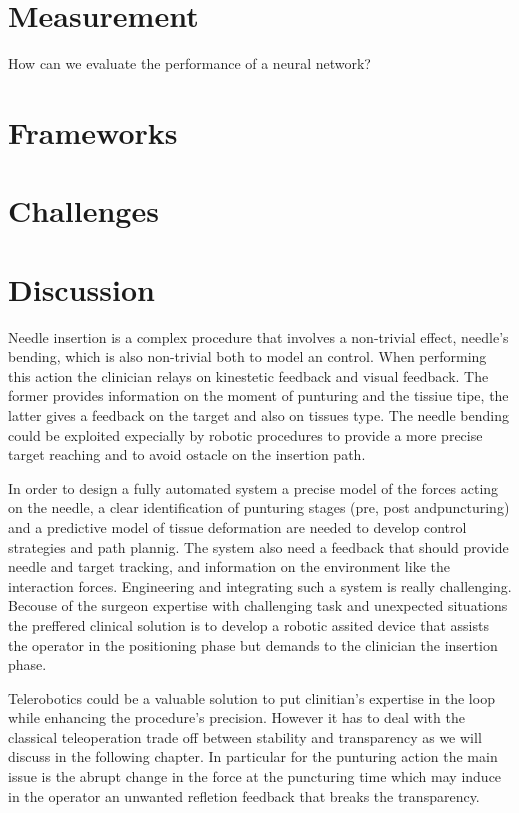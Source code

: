 \section{Measurement}
How can we evaluate the performance of a neural network?



\section{Frameworks}


\section{Challenges}

\section{Discussion}
Needle insertion is a complex procedure that involves a non-trivial effect, needle's bending, which is also non-trivial both to model an control.
When performing this action the clinician relays on kinestetic feedback and visual feedback. The former provides information on the moment of punturing and the tissiue tipe, the latter gives a feedback on the target and also on tissues type.
The needle bending could be exploited expecially by robotic procedures to provide a more precise target reaching and to avoid ostacle on the insertion path.

In order to design a fully automated system a precise model of the forces acting on the needle, a clear identification of punturing stages (pre, post andpuncturing) and a predictive model of tissue deformation are needed to develop control strategies and path plannig. The system also need a feedback that should provide needle and target tracking, and information on the environment like the interaction forces.
Engineering and integrating such a system is really challenging.
Becouse of the surgeon expertise with challenging task and unexpected situations the preffered clinical solution is to develop a robotic assited device that assists the operator in the positioning phase but demands to the clinician the insertion phase.

Telerobotics could be a valuable solution to put clinitian's expertise in the loop while enhancing the procedure's precision. However it has to deal with the classical teleoperation trade off between stability and transparency as we will discuss in the following chapter. In particular for the punturing action the main issue is the abrupt change in the force at the puncturing time which may induce in the operator an unwanted refletion feedback that breaks the transparency. 


\clearpage
\thispagestyle{empty}